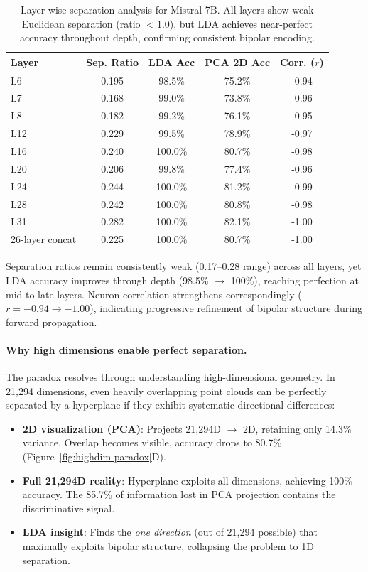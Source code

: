 \documentclass[11pt]{article}
\begin{document}
\begin{table}[h]
\centering
\caption{Layer-wise separation analysis for Mistral-7B. All layers show weak Euclidean separation (ratio $< 1.0$), but LDA achieves near-perfect accuracy throughout depth, confirming consistent bipolar encoding.}
\label{tab:layer-separation}
\begin{tabular}{lcccc}
\toprule
Layer & Sep. Ratio & LDA Acc & PCA 2D Acc & Corr. ($r$) \\
\midrule
L6  & 0.195 & 98.5\% & 75.2\% & -0.94 \\
L7  & 0.168 & 99.0\% & 73.8\% & -0.96 \\
L8  & 0.182 & 99.2\% & 76.1\% & -0.95 \\
L12 & 0.229 & 99.5\% & 78.9\% & -0.97 \\
L16 & 0.240 & 100.0\% & 80.7\% & -0.98 \\
L20 & 0.206 & 99.8\% & 77.4\% & -0.96 \\
L24 & 0.244 & 100.0\% & 81.2\% & -0.99 \\
L28 & 0.242 & 100.0\% & 80.8\% & -0.98 \\
L31 & 0.282 & 100.0\% & 82.1\% & -1.00 \\
\midrule
26-layer concat & 0.225 & 100.0\% & 80.7\% & -1.00 \\
\bottomrule
\end{tabular}
\end{table}

Separation ratios remain consistently weak (0.17--0.28 range) across all layers, yet LDA accuracy improves through depth (98.5\% $\to$ 100\%), reaching perfection at mid-to-late layers. Neuron correlation strengthens correspondingly ($r = -0.94 \to -1.00$), indicating progressive refinement of bipolar structure during forward propagation.

\paragraph{Why high dimensions enable perfect separation.}
The paradox resolves through understanding high-dimensional geometry. In 21,294 dimensions, even heavily overlapping point clouds can be perfectly separated by a hyperplane if they exhibit systematic directional differences:

\begin{itemize}
\item \textbf{2D visualization (PCA)}: Projects 21,294D $\to$ 2D, retaining only 14.3\% variance. Overlap becomes visible, accuracy drops to 80.7\% (Figure~\ref{fig:highdim-paradox}D).
\item \textbf{Full 21,294D reality}: Hyperplane exploits all dimensions, achieving 100\% accuracy. The 85.7\% of information lost in PCA projection contains the discriminative signal.
\item \textbf{LDA insight}: Finds the \textit{one direction} (out of 21,294 possible) that maximally exploits bipolar structure, collapsing the problem to 1D separation.
\end{itemize}
\end{document}
